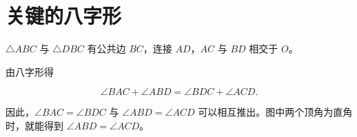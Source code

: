 \section{\texorpdfstring{关键的八字形}{关键的八字形}}

$\triangle ABC$ 与 $\triangle DBC$ 有公共边 $BC$，连接 $AD$，$AC$ 与 $BD$ 相交于 $O$。

\esdiagram{\esdiModel}

由八字形得

\[
\angle BAC+\angle ABD=\angle BDC+\angle ACD.
\]

因此，$\angle BAC=\angle BDC$ 与 $\angle ABD=\angle ACD$ 可以相互推出。图中两个顶角为直角时，就能得到 $\angle ABD=\angle ACD$。

